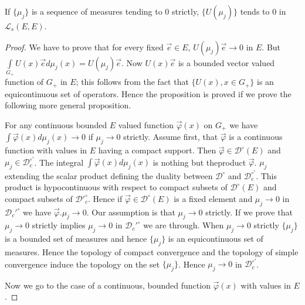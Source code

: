 \begin{prop}\label{chap18:prop18.2}
If $\{\mu_j\}$ is a sequence of measures tending to $0$ strictly,
$\{U(\mu_j)\}$ tends to $0$ in $\mathscr{L}_s(E, E)$.
\end{prop}
\begin{proof}
We have to prove that for every fixed $\overrightarrow{e} \in E$,
$U(\mu_j) \overrightarrow{e}\to 0$ in $E$. But $\int\limits_{G_+} U(x)
\overrightarrow{e} d\mu_j(x)=U(\mu_j)\overrightarrow{e}$. Now $U(x)
\overrightarrow{e}$ is a bounded vector valued function of $G_+$ in
$E$; this follows from the fact that $\{U(x), x \in G_+\}$ is an
equicontinuous set of operators. Hence the proposition is proved if we
prove the following more general proposition. 

For any continuous bounded $E$ valued function
$\overrightarrow{\varphi}(x)$ on $G_+$ we have $\int
\overrightarrow{\varphi}(x) d\mu_j(x) \to 0$ if $\mu_j \to 0$
strictly. Assume first, that $\overrightarrow{\varphi}$ is a
continuous function with values in $E$ having a compact support. Then
$\overrightarrow{\varphi} \in \mathscr{D}^\circ(E)$ and $\mu_j \in
\mathscr{D}_c^{\circ'}$. The integral $\int \overrightarrow{\varphi}(x)
d \mu_j(x)$ is nothing but the\pageoriginale product
$\overrightarrow{\varphi}$. $\mu_j$ extending the scalar product
defining the duality between $\mathscr{D}^\circ$ and
$\mathscr{D}_c^{\circ'}$. This product is hypocontinuous with respect
to compact subsets of $\mathscr{D}^\circ(E)$ and compact subsets of
$\mathscr{D'}_c^\circ$. Hence if $\overrightarrow{\varphi} \in
\mathscr{D}^\circ(E)$ is a fixed element and $\mu_j \to 0$ in
$\mathscr{D}_c'^\circ$ we have $\overrightarrow{\varphi}.\mu_j\to
0$. Our assumption is that $\mu_j\to 0$ strictly. If we prove that
$\mu_j \to 0$ strictly implies $\mu_j\to 0$ in $\mathscr{D}_c'^\circ$
we are through. When $\mu_j \to 0$ strictly $\{\mu_j\}$ is a bounded
set of measures and hence $\{\mu_j\}$ is an equicontinuous set of
measures. Hence the topology of compact convergence and the topology
of simple convergence induce the topology on the set
$\{\mu_j\}$. Hence $\mu_j\to 0$ in $\mathscr{D}_c^{\circ'}$. 

Now we go to the case of a continuous, bounded function
$\overrightarrow{\varphi}(x)$ with values in $E$. 


\end{proof}
